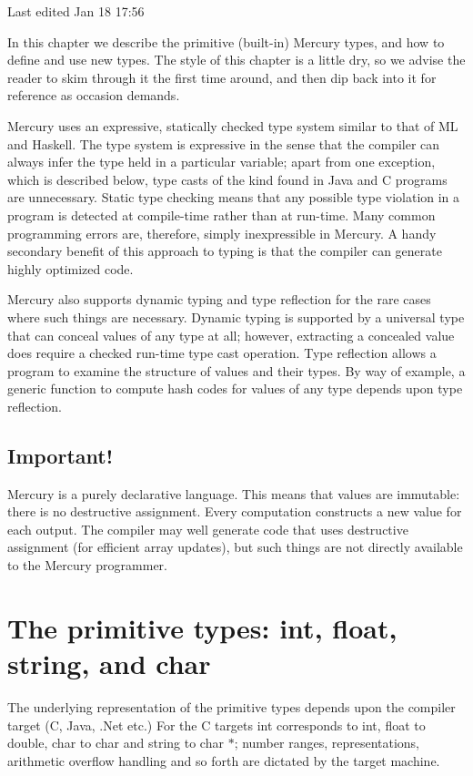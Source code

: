\documentclass[a4paper,11pt,notitlepage,onecolumn]{book}
\begin{document}
Last edited Jan 18 17:56

In this chapter we describe the primitive (\ie built-in) Mercury types, and
how to define and use new types.  The style of this chapter is a little dry,
so we advise the reader to skim through it the first time around, and then
dip back into it for reference as occasion demands.

Mercury uses an expressive, statically checked type system similar to
that of ML and Haskell.  The type system is expressive in the sense that the
compiler can always infer the type held in a particular variable; apart from
one exception, which is described below, type casts of the kind found in
Java and C programs are unnecessary.  Static type checking means that any
possible type violation in a program is detected at compile-time rather than
at run-time.  Many common programming errors are, therefore, simply
inexpressible in Mercury.  A handy secondary benefit of this approach to
typing is that the compiler can generate highly optimized code.

Mercury also supports dynamic typing and type reflection for the rare cases
where such things are necessary.  Dynamic typing is supported by a universal
type that can conceal values of any type at all; however, extracting a
concealed value does require a checked run-time type cast operation.  Type
reflection allows a program to examine the structure of values and their
types.  By way of example, a generic function to compute hash codes for
values of any type depends upon type reflection.

\subsection*{Important!}

Mercury is a purely declarative language.  This means that values are
immutable: there is no destructive assignment.  Every computation constructs
a new value for each output.  The compiler may well generate code that uses
destructive assignment (\eg for efficient array updates), but such things
are not directly available to the Mercury programmer.



\section{The primitive types: \textsf{int}, \textsf{float}, \textsf{string}, and \textsf{char}}

\Note The underlying representation of the primitive types
depends upon the compiler target (C, Java, .Net etc.)  For the C targets
\textsf{int} corresponds to \textsf{int}, \textsf{float} to \textsf{double}, \textsf{char} to \textsf{char}
and \textsf{string} to \textsf{char {\ensuremath{*}}}; number ranges, representations, arithmetic
overflow handling and so forth are dictated by the target machine.
\end{document}
